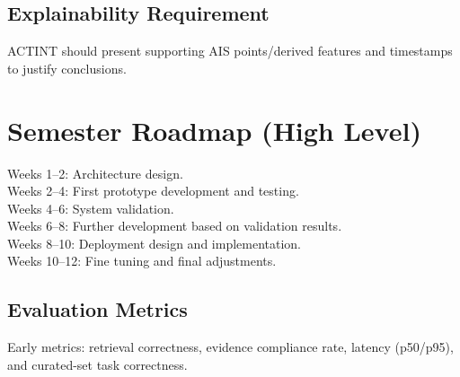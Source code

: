 \documentclass[11pt]{article}
\begin{document}
\subsection*{Explainability Requirement}
ACTINT should present supporting AIS points/derived features and timestamps to justify conclusions.

\section{Semester Roadmap (High Level)}
Weeks 1--2: Architecture design.\\
Weeks 2--4: First prototype development and testing.\\
Weeks 4--6: System validation.\\
Weeks 6--8: Further development based on validation results.\\
Weeks 8--10: Deployment design and implementation.\\
Weeks 10--12: Fine tuning and final adjustments.

\subsection*{Evaluation Metrics}
Early metrics: retrieval correctness, evidence compliance rate, latency (p50/p95), and curated-set task correctness.
\end{document}
